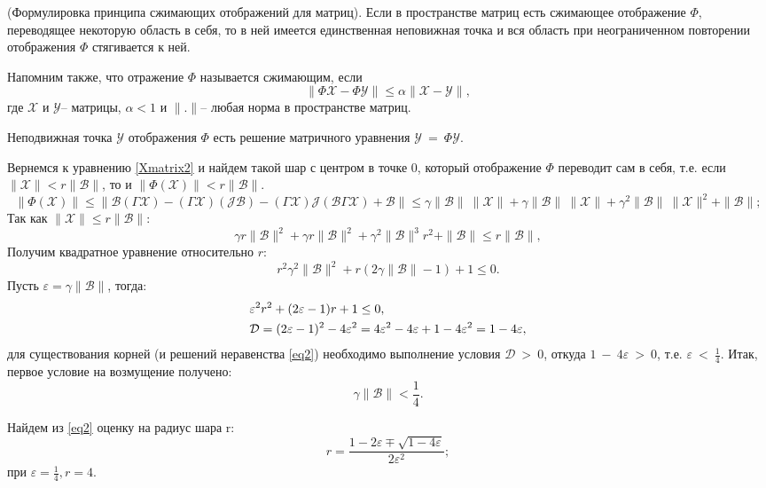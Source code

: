(Формулировка принципа сжимающих отображений для матриц). Если в пространстве матриц есть сжимающее отображение $\Phi$, переводящее некоторую область в себя, то в ней имеется единственная неповижная точка и вся область при неограниченном повторении отображения $\Phi$ стягивается к ней.

Напомним также, что отражение $\Phi$ называется сжимающим, если
$$
\|\Phi\mathcal{X}-\Phi\mathcal{Y}\|\leq \alpha\|\mathcal{X-Y}\|,
$$
где $\mathcal{X}$ и $\mathcal{Y}$-- матрицы, $\alpha < 1$ и $\|.\|$-- любая норма в пространстве матриц.

Неподвижная точка $\mathcal{Y}$ отображения $\Phi$ есть решение матричного уравнения $\mathcal{Y}~=~\Phi\mathcal{Y}$.

Вернемся к уравнению \eqref{Xmatrix2} и найдем такой шар с центром в точке 0, который отображение $\Phi$ переводит сам в себя, т.е. если $\|\mathcal{X}\|<r\|\mathcal{B}\|$, то и $\|\Phi(\mathcal{X})\|<r\|\mathcal{B}\|$.
$$
\|\Phi(\mathcal{X})\|\leq \|\mathcal{B}(\Gamma\mathcal{X})-(\Gamma\mathcal{X})(\mathcal{JB})-(\Gamma\mathcal{X})\mathcal{J}(\mathcal{B}\Gamma\mathcal{X})+\mathcal{B}\|\leq \gamma \|\mathcal{B}\|~ \|\mathcal{X}\|+\gamma \|\mathcal{B}\|~ \|\mathcal{X}\|+\gamma^2 \|\mathcal{B}\|~ \|\mathcal{X}\|^2 + \|\mathcal{B}\|;
$$
Так как $\|\mathcal{X}\| \leq r\|\mathcal{B}\|$:
$$
\gamma r \|\mathcal{B}\|^2+\gamma r \|\mathcal{B}\|^2+\gamma^2 \|\mathcal{B}\|^3 r^2 + \|\mathcal{B}\| \leq r\|\mathcal{B}\|,
$$
Получим квадратное уравнение относительно $r$:
$$
r^2 \gamma^2 \|\mathcal{B}\|^2 + r (2\gamma \|\mathcal{B}\|-1)+1 \leq 0.
$$
Пусть $\varepsilon=\gamma \|\mathcal{B}\|$, тогда:
\begin{align}
&\varepsilon^2 r^2 + (2 \varepsilon - 1)r + 1 \leq 0, \label{eq2} \\  
&\mathcal{D}=(2\varepsilon-1)^2 - 4\varepsilon^2 = 4\varepsilon^2-4\varepsilon+1-4\varepsilon^2=1-4\varepsilon, \notag
\end{align}
для существования корней (и решений неравенства \eqref{eq2}) необходимо выполнение условия $\mathcal{D}~>~0$, откуда $1~-~4\varepsilon~>~0$, т.е. $\varepsilon~<~\frac{1}{4}$.
Итак, первое условие на возмущение получено:
\begin{equation}\label{cond1}
\gamma \|\mathcal{B}\| < \frac{1}{4}.
\end{equation}

Найдем из \eqref{eq2} оценку на радиус шара r:
$$
r=\frac{1-2\varepsilon\mp\sqrt{1-4\varepsilon}}{2\varepsilon^2};
$$
при $\varepsilon=\frac{1}{4}, r=4.$